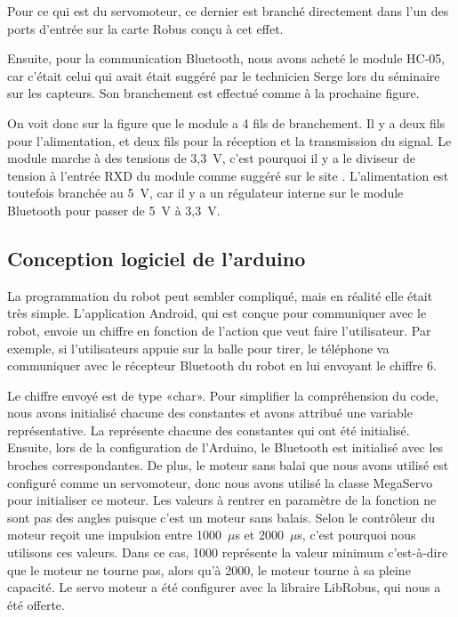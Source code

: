 
Pour ce qui est du servomoteur, ce dernier est branché directement dans l’un des ports d’entrée sur la carte Robus conçu à cet effet.

Ensuite, pour la communication Bluetooth, nous avons acheté le module HC-05, car c’était celui qui avait était suggéré par le technicien Serge lors du séminaire sur les capteurs.
Son branchement est effectué comme à la prochaine figure.


On voit donc sur la figure  que le module a 4 fils de branchement.
Il y a deux fils pour l’alimentation, et deux fils pour la réception et la transmission du signal.
Le module marche à des tensions de 3,3~V, c’est pourquoi il y a le diviseur de tension à l’entrée RXD du module comme suggéré sur le site \cite{noauthor_setting_nodate}.
L’alimentation est toutefois branchée au 5~V, car il y a un régulateur interne sur le module Bluetooth pour passer de 5~V à 3,3~V.

\subsection{Conception logiciel de l'arduino}



La programmation du robot peut sembler compliqué, mais en réalité elle était très simple.
L’application Android, qui est conçue pour communiquer avec le robot, envoie un chiffre en fonction de l’action que veut faire l’utilisateur.
Par exemple, si l’utilisateurs appuie sur la balle pour tirer, le téléphone va communiquer avec le récepteur Bluetooth du robot en lui envoyant le chiffre 6.


Le chiffre envoyé est de type «char».
Pour simplifier la compréhension du code, nous avons initialisé chacune des constantes et avons attribué une variable représentative.
La  représente chacune des constantes qui ont été initialisé.
Ensuite, lors de la configuration de l'Arduino, le Bluetooth est initialisé avec les broches correspondantes.
De plus, le moteur sans balai que nous avons utilisé est configuré comme un servomoteur, donc nous avons utilisé la classe MegaServo pour initialiser ce moteur.
Les valeurs à rentrer en paramètre de la fonction ne sont pas des angles puisque c’est un moteur sans balais.
Selon \cite{arduino_arduino_2019} le contrôleur du moteur reçoit une impulsion entre 1000~$\mu$s et 2000~$\mu$s, c’est pourquoi nous utilisons ces valeurs.
Dans ce cas, 1000 représente la valeur minimum c’est-à-dire que le moteur ne tourne pas, alors qu’à 2000, le moteur tourne à sa pleine capacité.
Le servo moteur a été configurer avec la libraire LibRobus, qui nous a été offerte.

